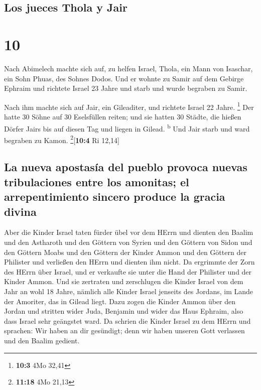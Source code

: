 \hypertarget{los-jueces-thola-y-jair}{%
\subsection{Los jueces Thola y Jair}\label{los-jueces-thola-y-jair}}

\hypertarget{section-9}{%
\section{10}\label{section-9}}

 Nach Abimelech machte sich auf, zu helfen Israel, Thola,
ein Mann von Isaschar, ein Sohn Phuas, des Sohnes Dodos. Und er wohnte
zu Samir auf dem Gebirge Ephraim  und richtete Israel 23
Jahre und starb und wurde begraben zu Samir.

 Nach ihm machte sich auf Jair, ein Gileaditer, und
richtete Israel 22 Jahre. \footnote{\textbf{10:3} 4Mo 32,41}
 Der hatte 30 Söhne auf 30 Eselsfüllen reiten; und sie
hatten 30 Städte, die hießen Dörfer Jairs bis auf diesen Tag und liegen
in Gilead. \textsuperscript{b}  Und Jair starb und ward
begraben zu Kamon. \footnote{\textbf{11:18} 4Mo 21,13}{[}\textbf{10:4}
Ri 12,14{]}

\hypertarget{la-nueva-apostasuxeda-del-pueblo-provoca-nuevas-tribulaciones-entre-los-amonitas-el-arrepentimiento-sincero-produce-la-gracia-divina}{%
\subsection{La nueva apostasía del pueblo provoca nuevas tribulaciones
entre los amonitas; el arrepentimiento sincero produce la gracia
divina}\label{la-nueva-apostasuxeda-del-pueblo-provoca-nuevas-tribulaciones-entre-los-amonitas-el-arrepentimiento-sincero-produce-la-gracia-divina}}

 Aber die Kinder Israel taten fürder übel vor dem HErrn
und dienten den Baalim und den Astharoth und den Göttern von Syrien und
den Göttern von Sidon und den Göttern Moabs und den Göttern der Kinder
Ammon und den Göttern der Philister und verließen den HErrn und dienten
ihm nicht.  Da ergrimmte der Zorn des HErrn über Israel,
und er verkaufte sie unter die Hand der Philister und der Kinder Ammon.
 Und sie zertraten und zerschlugen die Kinder Israel von
dem Jahr an wohl 18 Jahre, nämlich alle Kinder Israel jenseits des
Jordans, im Lande der Amoriter, das in Gilead liegt.  Dazu
zogen die Kinder Ammon über den Jordan und stritten wider Juda, Benjamin
und wider das Haus Ephraim, also dass Israel sehr geängstet ward.
 Da schrien die Kinder Israel zu dem HErrn und sprachen:
Wir haben an dir gesündigt; denn wir haben unseren Gott verlassen und
den Baalim gedient.

